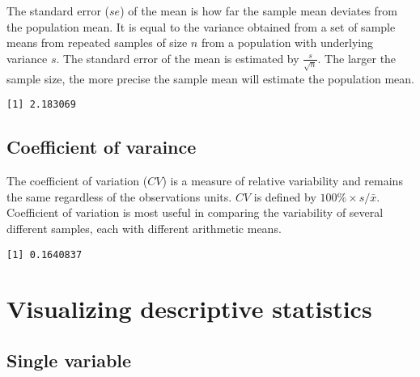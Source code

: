 \documentclass[]{book}
\newenvironment{Shaded}{\begin{snugshade}}{\end{snugshade}}
\newcommand{\KeywordTok}[1]{\textcolor[rgb]{0.13,0.29,0.53}{\textbf{#1}}}
\newcommand{\CommentTok}[1]{\textcolor[rgb]{0.56,0.35,0.01}{\textit{#1}}}
\newcommand{\OperatorTok}[1]{\textcolor[rgb]{0.81,0.36,0.00}{\textbf{#1}}}
\newcommand{\NormalTok}[1]{#1}
\theoremstyle{definition}
\theoremstyle{definition}
\theoremstyle{definition}
\theoremstyle{remark}
\begin{document}
The standard error (\({se}\)) of the mean is how far the sample mean
deviates from the population mean. It is equal to the variance obtained
from a set of sample means from repeated samples of size \({n}\) from a
population with underlying variance \({s}\). The standard error of the
mean is estimated by \(\frac{s}{\sqrt{n}}\). The larger the sample size,
the more precise the sample mean will estimate the population mean.

\begin{Shaded}
\end{Shaded}

\begin{verbatim}
[1] 2.183069
\end{verbatim}

\subsection{Coefficient of varaince}\label{coefficient-of-varaince}

The coefficient of variation (\({CV}\)) is a measure of relative
variability and remains the same regardless of the observations units.
\({CV}\) is defined by \({100\% \times s/\bar{x}}\). Coefficient of
variation is most useful in comparing the variability of several
different samples, each with different arithmetic means.

\begin{Shaded}
\end{Shaded}

\begin{verbatim}
[1] 0.1640837
\end{verbatim}

\section{Visualizing descriptive
statistics}\label{visualizing-descriptive-statistics}

\subsection{Single variable}\label{single-variable}
\end{document}

